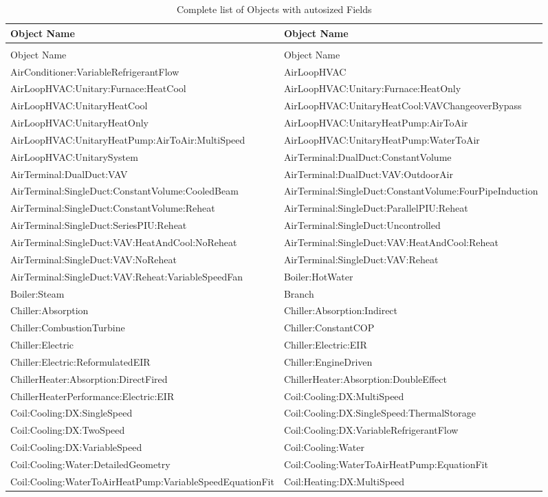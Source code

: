 \begin{longtable}[c]{p{3.02in}p{2.97in}}
\caption{Complete list of Objects with autosized Fields \label{table:complete-list-of-objects-with-autosized}} \tabularnewline
\toprule 
Object Name & Object Name \tabularnewline
\midrule
\endfirsthead

\caption[]{Complete list of Objects with autosized Fields} \tabularnewline
\toprule 
Object Name & Object Name \tabularnewline
\midrule
\endhead

AirConditioner:VariableRefrigerantFlow & AirLoopHVAC \tabularnewline
AirLoopHVAC:Unitary:Furnace:HeatCool & AirLoopHVAC:Unitary:Furnace:HeatOnly \tabularnewline
AirLoopHVAC:UnitaryHeatCool & AirLoopHVAC:UnitaryHeatCool:VAVChangeoverBypass \tabularnewline
AirLoopHVAC:UnitaryHeatOnly & AirLoopHVAC:UnitaryHeatPump:AirToAir \tabularnewline
AirLoopHVAC:UnitaryHeatPump:AirToAir:MultiSpeed & AirLoopHVAC:UnitaryHeatPump:WaterToAir \tabularnewline
AirLoopHVAC:UnitarySystem & AirTerminal:DualDuct:ConstantVolume \tabularnewline
AirTerminal:DualDuct:VAV & AirTerminal:DualDuct:VAV:OutdoorAir \tabularnewline
AirTerminal:SingleDuct:ConstantVolume:CooledBeam & AirTerminal:SingleDuct:ConstantVolume:FourPipeInduction \tabularnewline
AirTerminal:SingleDuct:ConstantVolume:Reheat & AirTerminal:SingleDuct:ParallelPIU:Reheat \tabularnewline
AirTerminal:SingleDuct:SeriesPIU:Reheat & AirTerminal:SingleDuct:Uncontrolled \tabularnewline
AirTerminal:SingleDuct:VAV:HeatAndCool:NoReheat & AirTerminal:SingleDuct:VAV:HeatAndCool:Reheat \tabularnewline
AirTerminal:SingleDuct:VAV:NoReheat & AirTerminal:SingleDuct:VAV:Reheat \tabularnewline
AirTerminal:SingleDuct:VAV:Reheat:VariableSpeedFan & Boiler:HotWater \tabularnewline
Boiler:Steam & Branch \tabularnewline
Chiller:Absorption & Chiller:Absorption:Indirect \tabularnewline
Chiller:CombustionTurbine & Chiller:ConstantCOP \tabularnewline
Chiller:Electric & Chiller:Electric:EIR \tabularnewline
Chiller:Electric:ReformulatedEIR & Chiller:EngineDriven \tabularnewline
ChillerHeater:Absorption:DirectFired & ChillerHeater:Absorption:DoubleEffect \tabularnewline
ChillerHeaterPerformance:Electric:EIR & Coil:Cooling:DX:MultiSpeed \tabularnewline
Coil:Cooling:DX:SingleSpeed & Coil:Cooling:DX:SingleSpeed:ThermalStorage \tabularnewline
Coil:Cooling:DX:TwoSpeed & Coil:Cooling:DX:VariableRefrigerantFlow \tabularnewline
Coil:Cooling:DX:VariableSpeed & Coil:Cooling:Water \tabularnewline
Coil:Cooling:Water:DetailedGeometry & Coil:Cooling:WaterToAirHeatPump:EquationFit \tabularnewline
Coil:Cooling:WaterToAirHeatPump:VariableSpeedEquationFit & Coil:Heating:DX:MultiSpeed \tabularnewline

\end{longtable}
